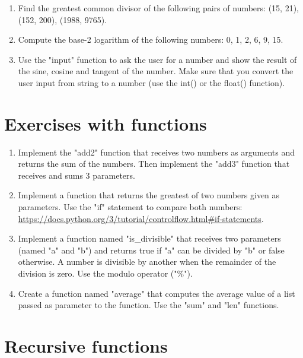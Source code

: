 \begin{enumerate}

\item Find the greatest common divisor of the following pairs of numbers: (15, 21), (152, 200), (1988, 9765). 

\item Compute the base-2 logarithm of the following numbers: 0, 1, 2, 6, 9, 15.

\item Use the "input" function to ask the user for a number and show the result of the sine, cosine and tangent of the number. Make sure that you convert the user input from string to a number (use the int() or the float() function).

\end{enumerate}

\section{Exercises with functions}

\begin{enumerate}

\item Implement the "add2" function that receives two numbers as arguments and returns the sum of the numbers. Then implement the "add3" function that receives and sums 3 parameters.

\item Implement a function that returns the greatest of two numbers given as parameters. Use the "if" statement to compare both numbers: \url{https://docs.python.org/3/tutorial/controlflow.html#if-statements}.

\item Implement a function named "is\_divisible" that receives two parameters (named "a" and "b") and returns true if "a" can be divided by "b" or false otherwise. A number is divisible by another when the remainder of the division is zero. Use the modulo operator ("\%").

\item Create a function named "average" that computes the average value of a list passed as parameter to the function. Use the "sum" and "len" functions.

\end{enumerate}

\section{Recursive functions}

